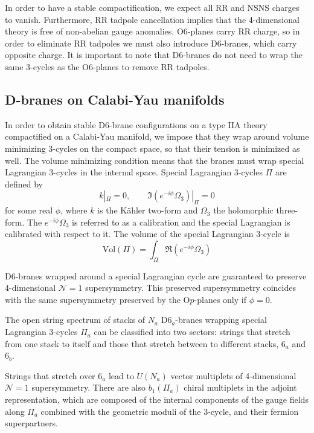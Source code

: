 In order to have a stable compactification, we expect all RR and NSNS charges to vanish.
Furthermore, RR tadpole cancellation implies that the 4-dimensional theory is free of non-abelian gauge anomalies.
O$6$-planes carry RR charge, so in order to eliminate RR tadpoles we must also introduce D$6$-branes,
which carry opposite charge.
It is important to note that D$6$-branes do not need to wrap the same 3-cycles as the O$6$-planes
to remove RR tadpoles.

\subsection{D-branes on Calabi-Yau manifolds}

In order to obtain stable D6-brane configurations on a type IIA theory compactified on a Calabi-Yau manifold, 
we impose that they wrap around volume minimizing 3-cycles on the compact space, so that their tension is minimized as well.
The volume minimizing condition means that the branes must wrap special Lagrangian 3-cycles in the internal space.
Special Lagrangian 3-cycles $\Pi$ are defined by
\begin{equation}
  k|_\Pi = 0 , \qquad \Im (e^{-i\phi}\Omega_3)|_\Pi=0
\end{equation}
for some real $\phi$, where $k$ is the Kähler two-form and $\Omega_3$ the holomorphic three-form.
The $e^{-i\phi}\Omega_3$ is referred to as a calibration and the special Lagrangian is calibrated with respect to it.%
The volume of the special Lagrangian 3-cycle is
\begin{equation}
  \mathrm{Vol}(\Pi)=\int_\Pi \Re(e^{-i\phi}\Omega_3)
\end{equation}

D6-branes wrapped around a special Lagrangian cycle are guaranteed to preserve 4-dimensional $\mathcal N=1$ supersymmetry. 
This preserved supersymmetry coincides with the same supersymmetry preserved by the O$p$-planes only if $\phi=0$.

The open string spectrum of stacks of $N_a$ D$6_a$-branes wrapping special Lagrangian 3-cycles $\Pi_a$ 
can be classified into two sectors: strings that stretch from one stack to itself and those that stretch between to different stacks, $6_a$ and $6_b$.

Strings that stretch over $6_a$ lead to $U(N_a)$ vector multiplets of 4-dimensional $\mathcal N=1$ supersymmetry.
There are also $b_1(\Pi_a)$ chiral multiplets in the adjoint representation,
which are composed of the internal components of the gauge fields along $\Pi_a$ combined with 
the geometric moduli of the $3$-cycle, and their fermion superpartners.

